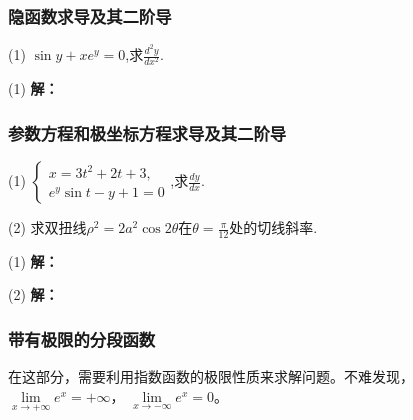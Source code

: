 \documentclass[12pt , a4paper , oneside]{ctexart}
\begin{document}
            \subsubsection{隐函数求导及其二阶导}
            (1) $\sin y+x e^y = 0$,求$\frac{d^2 y}{dx^2}$.

            \begin{mdframed}
            (1) \textbf{解：}

            \end{mdframed}

            \subsubsection{参数方程和极坐标方程求导及其二阶导}
            (1) $\begin{cases}
                x=3t^2+2t+3,\\
                e^y \sin{t}-y+1=0
            \end{cases}$,求$\frac{dy}{dx}$.

            (2) 求双扭线$\rho^2 = 2a^2 \cos{2\theta}$在$\theta = \frac{\pi}{12}$处的切线斜率.
            
            \begin{mdframed}
            (1) \textbf{解：}

            \end{mdframed}
            
            \begin{mdframed}
            (2) \textbf{解：}

            \end{mdframed}

            \subsubsection{带有极限的分段函数}
            \begin{center}
            \end{center}
            {\fangsong 在这部分，需要利用指数函数的极限性质来求解问题。不难发现，$ \lim\limits_{x \to +\infty} e^x = +\infty$，
            $ \lim\limits_{x \to -\infty} e^x = 0$。}
            
\end{document}
